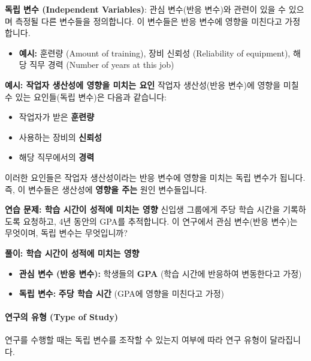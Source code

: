 \documentclass[11pt,a4paper]{book}
\newcommand{\concept}[1]{\textbf{#1}}
\theoremstyle{definition}
\begin{document}
\begin{tcolorbox}[infobox, title={연구 시작의 두 번째 단계: 독립 변수 정의 (Step Two in Initiating a Study)}]
\concept{독립 변수 (Independent Variables)}: 관심 변수(반응 변수)와 관련이 있을 수 있으며 측정될 다른 변수들을 정의합니다. 이 변수들은 반응 변수에 영향을 미친다고 가정합니다.
\begin{itemize}
    \item \textbf{예시:} 훈련량 (Amount of training), 장비 신뢰성 (Reliability of equipment), 해당 직무 경력 (Number of years at this job)
\end{itemize}
\end{tcolorbox}

\begin{examplebox}
\textbf{예시: 작업자 생산성에 영향을 미치는 요인}
작업자 생산성(반응 변수)에 영향을 미칠 수 있는 요인들(독립 변수)은 다음과 같습니다:
\begin{itemize}
    \item 작업자가 받은 \textbf{훈련량}
    \item 사용하는 장비의 \textbf{신뢰성}
    \item 해당 직무에서의 \textbf{경력}
\end{itemize}
이러한 요인들은 작업자 생산성이라는 반응 변수에 영향을 미치는 독립 변수가 됩니다. 즉, 이 변수들은 생산성에 \textbf{영향을 주는} 원인 변수들입니다.
\end{examplebox}

\begin{practicebox}
\textbf{연습 문제: 학습 시간이 성적에 미치는 영향}
신입생 그룹에게 주당 학습 시간을 기록하도록 요청하고, 4년 동안의 GPA를 추적합니다.
이 연구에서 관심 변수(반응 변수)는 무엇이며, 독립 변수는 무엇입니까?
\end{practicebox}

\begin{solutionbox}
\textbf{풀이: 학습 시간이 성적에 미치는 영향}
\begin{itemize}
    \item \textbf{관심 변수 (반응 변수):} 학생들의 \textbf{GPA} (학습 시간에 반응하여 변동한다고 가정)
    \item \textbf{독립 변수:} \textbf{주당 학습 시간} (GPA에 영향을 미친다고 가정)
\end{itemize}
\end{solutionbox}

\paragraph{연구의 유형 (Type of Study)}
연구를 수행할 때는 독립 변수를 조작할 수 있는지 여부에 따라 연구 유형이 달라집니다.
\end{document}
